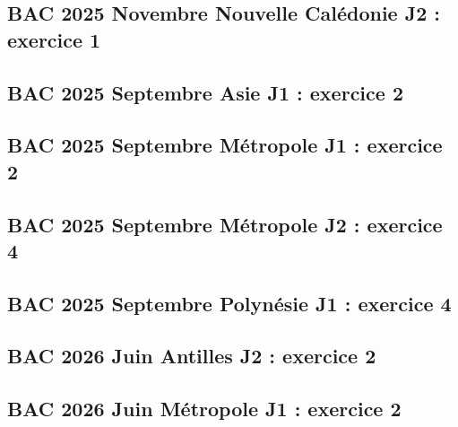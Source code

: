 \documentclass[lang=fr,edition=teacher,layout=sheet]{mxbook}
\begin{document}
\subsection*{BAC 2025 Novembre Nouvelle Calédonie J2 : exercice 1}
\begingroup\endgroup
\par\bigskip
{}\subsection*{BAC 2025 Septembre Asie J1 : exercice 2}
\begingroup\endgroup
\par\bigskip
{}\subsection*{BAC 2025 Septembre Métropole J1 : exercice 2}
\begingroup\endgroup
\par\bigskip
{}\subsection*{BAC 2025 Septembre Métropole J2 : exercice 4}
\begingroup\endgroup
\par\bigskip
{}\subsection*{BAC 2025 Septembre Polynésie J1 : exercice 4}
\begingroup\endgroup
\par\bigskip
{}\subsection*{BAC 2026 Juin Antilles J2 : exercice 2}
\begingroup\endgroup
\par\bigskip
{}\subsection*{BAC 2026 Juin Métropole J1 : exercice 2}
\end{document}

